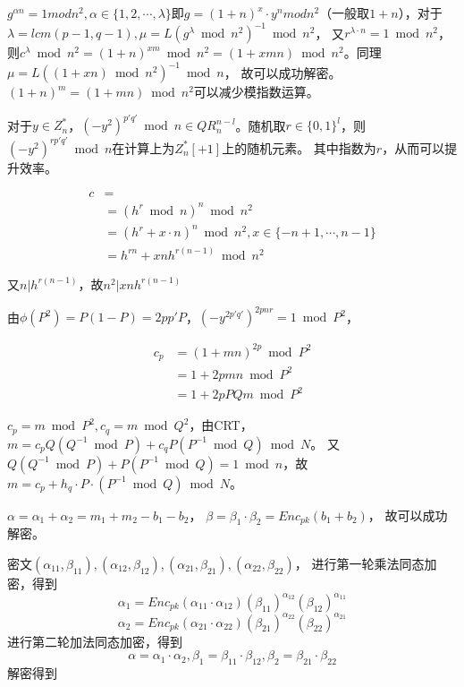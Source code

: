 \documentclass[12pt, a4paper, oneside]{ctexart}
\begin{document}
$g^{\alpha n} = 1 mod n^2,\alpha \in \{ 1,2,\cdots,\lambda\}$即$g = (1+n)^x\cdot y^n mod n^2$（一般取$1+n$），对于$ \lambda = lcm(p-1,q-1),\mu = L(g^{\lambda} \bmod n^2)^{-1} \bmod n^2$，
又$r^{\lambda\cdot n}=1\bmod n^2$，则$c^{\lambda }\bmod n^2 = (1+n)^{xm}\bmod n^2 = (1+xmn)\bmod n^2$。同理$\mu = L((1+xn)\bmod n^2)^{-1}\bmod n$，
故可以成功解密。$(1+n)^m = (1+mn) \bmod n^2$可以减少模指数运算。
\par

对于$y\in Z_{n}^*$，$(-y^2)^{p'q'} \bmod n\in QR_n^{n-l}$。随机取$r\in\{ 0,1\}^l$，则$(-y^2)^{rp'q'} \bmod n$在计算上为$Z^*_n\left [ +1\right ]$上的随机元素。
其中指数为$r$，从而可以提升效率。
\par
\begin{equation}
    \begin{split}
        c&=\\
        &=(h^r\bmod n)^n \bmod n^2\\
        &=(h^r+x\cdot n) ^n \bmod n^2,x\in \{-n+1,\cdots,n-1\}\\
        &=h^{rn}+ xnh^{r(n-1)}\bmod n^2
    \end{split}
\end{equation}

又$n|h^{r(n-1)}$，故$n^2|xnh^{r(n-1)}$\par

由$\phi(P^2) = P(1-P) = 2pp'P $，$(-y^{2p'q'})^{2pnr} = 1\bmod P^2$，

\begin{equation}
    \begin{split}
        c_p &= (1+mn)^{2p} \bmod P^2\\
        &=1+2pmn \bmod P^2\\
        &=1+2pPQm \bmod P^2
    \end{split}
\end{equation}

$c_p = m \bmod P^2,c_q = m \bmod Q^2$，由CRT，$m = c_pQ(Q^{-1}\bmod P)+ c_qP(P^{-1}\bmod Q) \bmod N$。
又$Q(Q^{-1}\bmod P) + P(P^{-1}\bmod Q) = 1\bmod n$，故$m=c_p+h_q\cdot P\cdot (P^{-1}  \bmod Q)  \bmod N$。
\par

$\alpha =\alpha_1 +\alpha_2 = m_1+m_2-b_1-b_2$，
$\beta = \beta_1 \cdot \beta_2 = Enc_{pk}(b_1+b_2)$，
故可以成功解密。
\par

密文$(\alpha_{11},\beta_{11}),(\alpha_{12},\beta_{12}),(\alpha_{21},\beta_{21}),(\alpha_{22},\beta_{22})$，
进行第一轮乘法同态加密，得到
$$ \alpha_1 = Enc_{pk}(\alpha_{11}\cdot \alpha_{12}) (\beta_{11})^{\alpha_{12}}(\beta_{12})^{\alpha_{11}}$$
$$ \alpha_2 = Enc_{pk}(\alpha_{21}\cdot \alpha_{22}) (\beta_{21})^{\alpha_{22}}(\beta_{22})^{\alpha_{21}}$$
进行第二轮加法同态加密，得到
$$ \alpha=\alpha_1\cdot \alpha_2,\beta_1 = \beta_{11}\cdot \beta_{12},\beta_2 = \beta_{21}\cdot \beta_{22}$$
解密得到
\end{document}
